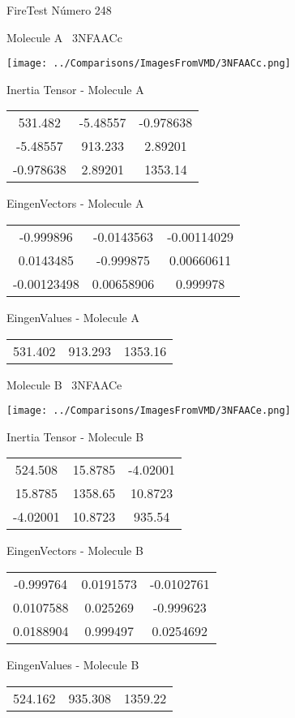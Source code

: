 \vtab[-3cm]
\begin{center}
{\large FireTest \tab Número 248}
\end{center}
\begin{multicols}{2}
\begin{center}

Molecule A \
3NFAACc

\texttt{[image: ../Comparisons/ImagesFromVMD/3NFAACc.png]}

Inertia Tensor - Molecule A \\
\begin{tabular}{|c c c|}
531.482	 & 	-5.48557	 & 	-0.978638	 \\
-5.48557	 & 	913.233	 & 	2.89201	 \\
-0.978638	 & 	2.89201	 & 	1353.14
\end{tabular}

\vtab
 EingenVectors - Molecule A     \\
\begin{tabular}{|c c c|}
-0.999896	 & 	-0.0143563	 & 	-0.00114029	 \\
0.0143485	 & 	-0.999875	 & 	0.00660611	 \\
-0.00123498	 & 	0.00658906	 & 	0.999978
\end{tabular}

\vtab
 EingenValues - Molecule A     \\
\begin{tabular}{|c c c|}
531.402	 & 	913.293	 & 	1353.16	 \\
\end{tabular}
\columnbreak

Molecule B \
3NFAACe

\texttt{[image: ../Comparisons/ImagesFromVMD/3NFAACe.png]}

Inertia Tensor - Molecule B \\
\begin{tabular}{|c c c|}
524.508	 & 	15.8785	 & 	-4.02001	 \\
15.8785	 & 	1358.65	 & 	10.8723	 \\
-4.02001	 & 	10.8723	 & 	935.54
\end{tabular}

\vtab
 EingenVectors - Molecule B     \\
\begin{tabular}{|c c c|}
-0.999764	 & 	0.0191573	 & 	-0.0102761	 \\
0.0107588	 & 	0.025269	 & 	-0.999623	 \\
0.0188904	 & 	0.999497	 & 	0.0254692
\end{tabular}

\vtab
 EingenValues - Molecule B     \\
\begin{tabular}{|c c c|}
524.162	 & 	935.308	 & 	1359.22	 \\
\end{tabular}

\end{center}
\end{multicols}

